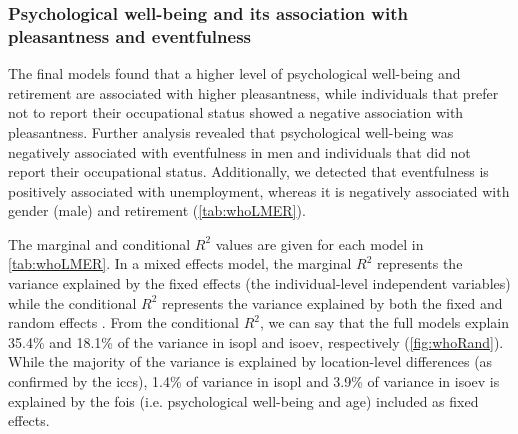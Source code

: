 \subsubsection*{Psychological well-being and its association with pleasantness and eventfulness}

The final models found that a higher level of psychological well-being and retirement are associated with higher pleasantness, while individuals that prefer not to report their occupational status showed a negative association with pleasantness. Further analysis revealed that psychological well-being was negatively associated with eventfulness in men and individuals that did not report their occupational status. Additionally, we detected that eventfulness is positively associated with unemployment, whereas it is negatively associated with gender (male) and retirement (\cref{tab:whoLMER}). 

The marginal and conditional $R^2$ values are given for each model in \cref{tab:whoLMER}. In a mixed effects model, the marginal $R^2$ represents the variance explained by the fixed effects (the individual-level independent variables) while the conditional $R^2$ represents the variance explained by both the fixed and random effects \citep{Nakagawa2012general}. From the conditional $R^2$, we can say that the full models explain 35.4\% and 18.1\% of the variance in \gls{isopl} and \gls{isoev}, respectively (\cref{fig:whoRand}). While the majority of the variance is explained by location-level differences (as confirmed by the \glspl{icc}), 1.4\% of variance in \gls{isopl} and 3.9\% of variance in \gls{isoev} is explained by the \glspl{foi} (i.e. psychological well-being and age) included as fixed effects.


